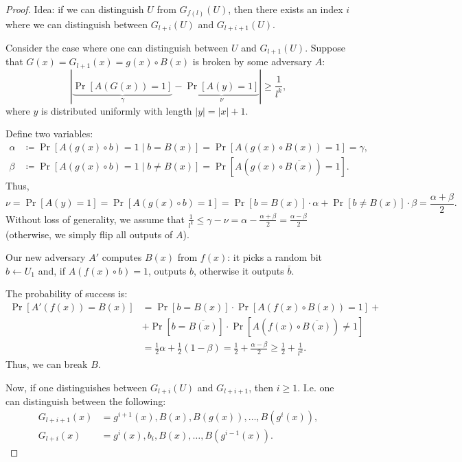 \begin{proof}
  Idea: if we can distinguish $U$ from $G_{f(l)}(U)$, then there exists an index $i$ where we can distinguish between $G_{l + i}(U)$ and $G_{l + i + 1}(U)$.

  Consider the case where one can distinguish between $U$ and $G_{l + 1}(U)$.
  Suppose that $G(x) = G_{l + 1}(x) = g(x) \circ B(x)$ is broken by some adversary $A$:
   \[
	   \left| \underbrace{\Pr[A(G(x)) = 1]}_{\gamma} - \underbrace{\Pr[A(y) = 1]}_{\nu} \right| \ge \frac{1}{l^{k}}
  ,\] 
  where $y$ is distributed uniformly with length $|y| = |x| + 1$.
  
  Define two variables:
   \begin{align*}
	   \alpha &\coloneqq \Pr[A(g(x) \circ b) = 1  \mid b = B(x)] = \Pr[A(g(x) \circ B(x)) = 1] = \gamma,\\
	   \beta &\coloneqq \Pr[A(g(x) \circ b) = 1  \mid b \neq  B(x)] = \Pr[A(g(x) \circ \overline{B(x)}) = 1].
   \end{align*}
  Thus,
  \[
	  \nu = \Pr[A(y) = 1] = \Pr[A(g(x) \circ b) = 1] = \Pr[b = B(x)] \cdot \alpha + \Pr[b \neq B(x)] \cdot \beta = \frac{\alpha + \beta}{2}.
  \] 
  Without loss of generality, we assume that $\frac{1}{l^{k}} \le \gamma - \nu = \alpha - \frac{\alpha + \beta}{2} = \frac{\alpha - \beta}{2}$ (otherwise, we simply flip all outputs of $A$).
  
  Our new adversary $A'$ computes $B(x)$ from $f(x)$: it picks a random bit $b \gets U_1$ and, if $A(f(x) \circ b) = 1$, outputs $b$, otherwise it outputs $\overline{b}$.
  
  The probability of success is:
  \begin{align*}
	  \Pr[A'(f(x)) = B(x)] &= \Pr[b = B(x)] \cdot \Pr[A(f(x) \circ B(x)) = 1] + \\
						   &+ \Pr[b = \overline{B(x)}] \cdot \Pr[A(f(x) \circ \overline{B(x)}) \neq 1] \\
						   &= \frac{1}{2} \alpha + \frac{1}{2} (1 - \beta) = \frac{1}{2} + \frac{\alpha - \beta}{2} \ge  \frac{1}{2} + \frac{1}{l^{k}}.
  \end{align*}
	  Thus, we can break $B$.
	  
	Now, if one distinguishes between $G_{l + i}(U)$ and $G_{l+i+1}$, then $i \ge 1$.
	I.e. one can distinguish between the following:
	\begin{align*}
	    G_{l+i+1}(x) &= g^{i+1}(x), B(x), B(g(x)), \dots, B(g^i(x)), \\
	    G_{l+i}(x) &= g^i(x), b_i, B(x), \dots, B(g^{i-1}(x)).
	\end{align*}
	

\end{proof}
